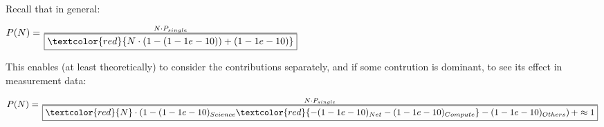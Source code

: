 {%
  Recall that in general:
  
			\Large $ P(N) = \frac{N\cdot P_{single}}{\boxed{\textcolor{red}{N\cdot \left(1-\alpha\right)+\alpha}}}$
			

  This enables (at least theoretically) to consider 
  the contributions separately, and if some contrution is dominant,
  to see its effect in measurement data:  
   	
   	\maxsizebox{\columnwidth}{!}
   	{
			\Large $ P(N) = \frac{N\cdot P_{single}}{\boxed{\textcolor{red}{N}\cdot \left(1-\alpha_{Science}  
						\textcolor{red}{-\alpha_{Net} -\alpha_{Compute}} -\alpha_{Others}    \right)+\approx 1}}$
					}
	
}



